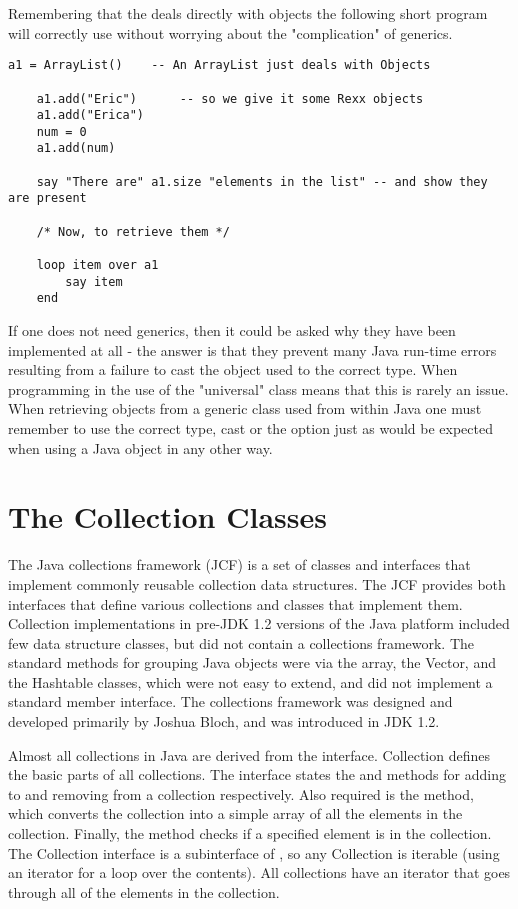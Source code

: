 Remembering that the  deals directly with objects the following short \nr{} program will correctly use  without worrying about the "complication" of generics.

\begin{lstlisting}[label=ArrayListExample, caption=ArrayList Example]
	a1 = ArrayList()	-- An ArrayList just deals with Objects

	a1.add("Eric")		-- so we give it some Rexx objects
	a1.add("Erica")
	num = 0
	a1.add(num)

	say "There are" a1.size "elements in the list" -- and show they are present

	/* Now, to retrieve them */

	loop item over a1
		say item
	end
\end{lstlisting}

If one does not need generics, then it could be asked why they have been implemented at all - the answer is that they prevent many Java run-time errors resulting from a failure to cast the object used to the correct type. When programming in \nr{} the use of the "universal"  class means that this is rarely an issue. When retrieving objects from a generic class used from within Java one must remember to use the correct type, cast or the  option just as would be expected when using a Java object in any other way.


\section{The Collection Classes}
The Java collections framework (JCF) is a set of classes and interfaces that implement commonly reusable collection data structures.
The JCF provides both interfaces that define various
collections and classes that implement them. Collection
implementations in pre-JDK 1.2 versions of the Java platform included
few data structure classes, but did not contain a collections
framework. The standard methods for grouping Java objects were via the array, the Vector, and the Hashtable classes, which were not easy to extend, and did not implement a standard member interface.
The collections framework was designed and developed primarily by
Joshua Bloch, and was introduced in JDK 1.2.

Almost all collections in Java are derived from the
 interface. Collection defines the basic parts of
all collections. The interface states the  and  methods
for adding to and removing from a collection respectively. Also
required is the  method, which converts the collection into a
simple array of all the elements in the collection. Finally, the
 method checks if a specified element is in the
collection. The Collection interface is a subinterface of
, so any Collection is iterable (using an
iterator for a loop over the contents).
All collections have an iterator that goes
through all of the elements in the collection.

